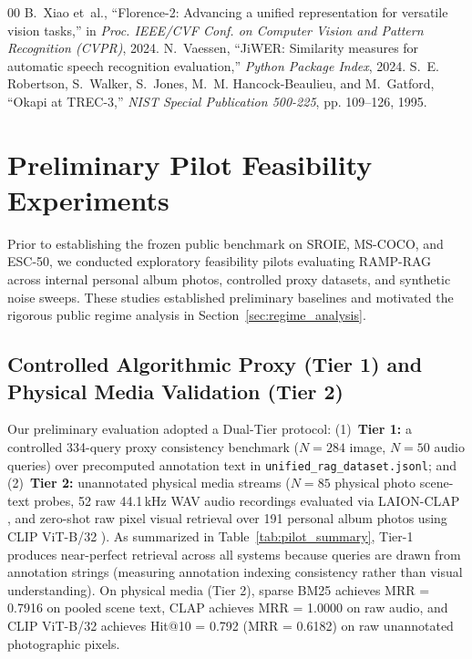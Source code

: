 \documentclass[conference]{IEEEtran}
\begin{document}
\begin{thebibliography}{00}
B.~Xiao et~al., ``Florence-2: Advancing a unified representation for versatile vision tasks,'' in \emph{Proc. IEEE/CVF Conf. on Computer Vision and Pattern Recognition (CVPR)}, 2024.
N.~Vaessen, ``JiWER: Similarity measures for automatic speech recognition evaluation,'' \emph{Python Package Index}, 2024.
S.~E. Robertson, S.~Walker, S.~Jones, M.~M. Hancock-Beaulieu, and M.~Gatford, ``Okapi at TREC-3,'' \emph{NIST Special Publication 500-225}, pp. 109--126, 1995.
\end{thebibliography}


\appendices

\section{Preliminary Pilot Feasibility Experiments}
\label{sec:appendix_pilot}
Prior to establishing the frozen public benchmark on SROIE, MS-COCO, and ESC-50, we conducted exploratory feasibility pilots evaluating RAMP-RAG across internal personal album photos, controlled proxy datasets, and synthetic noise sweeps. These studies established preliminary baselines and motivated the rigorous public regime analysis in Section~\ref{sec:regime_analysis}.

\subsection{Controlled Algorithmic Proxy (Tier 1) and Physical Media Validation (Tier 2)}
\label{sec:tier2_eval}
Our preliminary evaluation adopted a Dual-Tier protocol: (1)~\textbf{Tier 1:} a controlled 334-query proxy consistency benchmark ($N=284$ image, $N=50$ audio queries) over precomputed annotation text in \texttt{unified\_rag\_dataset.jsonl}; and (2)~\textbf{Tier 2:} unannotated physical media streams ($N=85$ physical photo scene-text probes, 52 raw 44.1\,kHz WAV audio recordings evaluated via LAION-CLAP \cite{wu2023clap}, and zero-shot raw pixel visual retrieval over 191 personal album photos using CLIP ViT-B/32 \cite{radford2021clip}). As summarized in Table~\ref{tab:pilot_summary}, Tier-1 produces near-perfect retrieval across all systems because queries are drawn from annotation strings (measuring annotation indexing consistency rather than visual understanding). On physical media (Tier 2), sparse BM25 achieves MRR = 0.7916 on pooled scene text, CLAP achieves MRR = 1.0000 on raw audio, and CLIP ViT-B/32 achieves Hit@10 = 0.792 (MRR = 0.6182) on raw unannotated photographic pixels.
\end{document}
